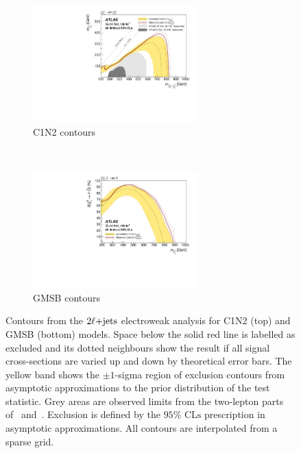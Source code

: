 \begin{figure}[tp]
\centering
\begin{subfigure}{\textwidth}
    \centering
    \includegraphics[width=0.7\textwidth]{figures/2ljets_contours_c1n2.pdf}
    \caption{C1N2 contours}
\end{subfigure}
\\[1em]
\begin{subfigure}{\textwidth}
    \centering
    \includegraphics[width=0.7\textwidth]{figures/2ljets_contours_gmsb.pdf}
    \caption{GMSB contours}
\end{subfigure}
\caption{%
Contours from the $2\ell\mathrm{+jets}$ electroweak analysis for
C1N2 (top) and GMSB (bottom) models.
Space below the solid red line is labelled as excluded and its dotted
neighbours show the result if all signal cross-sections are varied up and down
by theoretical error bars.
The yellow band shows the $\pm1$-sigma region of exclusion contours
from asymptotic approximations to the prior distribution of the test statistic.
Grey areas are observed limits from the two-lepton parts
of~\cite{SUSY-2016-24} and~\cite{SUSY-2013-11}.
Exclusion is defined by the $95\%$ $\mathrm{CLs}$ prescription
in asymptotic approximations.
All contours are interpolated from a sparse grid.
}
\label{fig:2ljets_contours}
\end{figure}



